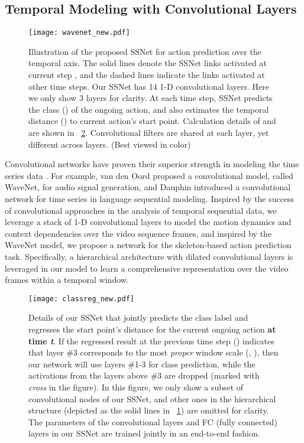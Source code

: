 \documentclass[10pt,twocolumn,letterpaper]{article}
\begin{document}
\subsection{Temporal Modeling with Convolutional Layers}
\label{sec:method:dilatedCNN}

\begin{figure}[tp]
	\centerline{\texttt{[image: wavenet\_new.pdf]}}
	\caption{
Illustration of the proposed SSNet for action prediction over the temporal axis.
The solid lines denote the SSNet links activated at current step ,
and the dashed lines indicate the links activated at other time steps.
Our SSNet has 14 1-D convolutional layers.
Here we only show 3 layers for clarity.
At each time step, SSNet predicts the class () of the ongoing action,
and also estimates the temporal distance () to current action's start point.
Calculation details of  and  are shown in \figurename{~\ref{fig:classreg}}.
Convolutional filters are shared at each layer, yet different across layers.
(Best viewed in color)
}
	\label{fig:wavenet}
\end{figure}






Convolutional networks \cite{lecun1995convolutional} have proven their superior strength in modeling the time series data \cite{van2016wavenet,dauphin2016language,varol2017long}.
For example, van den Oord \etal \cite{van2016wavenet} proposed a convolutional model, called WaveNet, for audio signal generation, and
Dauphin \etal \cite{dauphin2016language} introduced a convolutional network for time series in language sequential modeling. Inspired by the success of convolutional approaches in the analysis of temporal sequential data,
we leverage a stack of 1-D convolutional layers to model the motion dynamics and context dependencies over the video sequence frames,
and inspired by the WaveNet model, we propose a network for the skeleton-based action prediction task.
Specifically, a hierarchical architecture with dilated convolutional layers is leveraged in our model
to learn a comprehensive representation over the video frames within a temporal window. 

\begin{figure}[tp]
\centerline{\texttt{[image: classreg\_new.pdf]}}
\caption{Details of our SSNet that jointly predicts the class label  and regresses the start point's distance  for the current ongoing action \textbf{at time \emph{t}}.
If the regressed result  at the previous time step () indicates that layer \#3 corresponds to the most \emph{proper} window scale (\ie, ),
then our network will use layers \#1-3 for class prediction,
while the activations from the layers above \#3 are dropped (marked with \emph{cross} in the figure).
In this figure, we only show a subset of convolutional nodes of our SSNet,
and other ones in the hierarchical structure (depicted as the solid lines in \figurename{~\ref{fig:wavenet}}) are omitted for clarity.
The parameters of the convolutional layers and FC (fully connected) layers in our SSNet are trained jointly in an end-to-end fashion.
}
\label{fig:classreg}
\end{figure}
\end{document}
